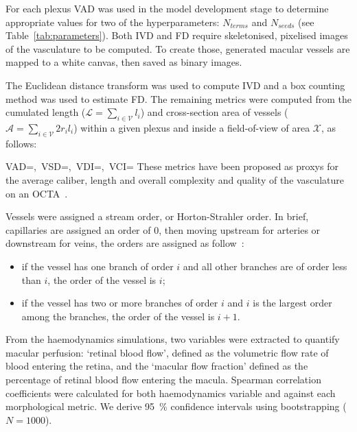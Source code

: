 \documentclass[11pt,]{article}
\let\oldequation\equation
\let\oldendequation\endequation
\renewenvironment{equation}
  {\linenomathNonumbers\oldequation}
  {\oldendequation\endlinenomath}
\begin{document}
For each plexus VAD was used in the model development stage to determine appropriate values for two of the hyperparameters: $N_{terms}$ and $N_{seeds}$ (see Table~\ref{tab:parameters}).
Both IVD and FD require skeletonised, pixelised images of the vasculature to be computed.
To create those, generated macular vessels are mapped to a white canvas, then saved as binary images.

The Euclidean distance transform was used to compute IVD and a box counting method was used to estimate FD. The remaining metrics were computed from the cumulated length ($\mathcal L=\sum_{i\in\mathcal V} l_i$) and cross-section area of vessels ($\mathcal A=\sum_{i\in\mathcal V} 2r_il_i$) within a given plexus and inside a field-of-view of area $\mathcal X$,  as follows:

\begin{equation}\label{eq:OCTAmetrics}
VAD=,\ VSD=,\ VDI=,\ VCI=
\end{equation}
These metrics have been proposed as proxys for the average caliber, length and overall complexity and quality of the vasculature on an OCTA~\cite{Chu2016}.

Vessels were assigned a stream order, or Horton-Strahler order.
In brief, capillaries are assigned an order of 0, then moving upstream for arteries or downstream for veins, the orders are assigned as follow~\cite{An2020}:
\begin{itemize}
\item if the vessel has one branch of order $i$ and all other branches are of order less than $i$, the order of the vessel is $i$;
\item if the vessel has two or more branches of order $i$ and $i$ is the largest order among the branches, the order of the vessel is $i+1$.
\end{itemize}

From the haemodynamics simulations, two variables were extracted to quantify macular perfusion: `retinal blood flow', defined as the volumetric flow rate of blood entering the retina, and the `macular flow fraction' defined as the percentage of retinal blood flow entering the macula.
Spearman correlation coefficients were calculated for both haemodynamics variable and against each morphological metric.
We derive \SI{95}{\percent} confidence intervals using bootstrapping ($N=1000$).
\end{document}
